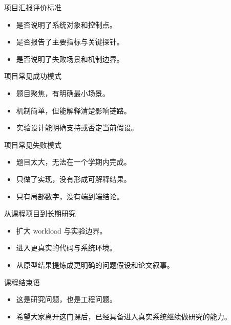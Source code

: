 \begin{frame}{项目汇报评价标准}
  \begin{itemize}
    \item 是否说明了系统对象和控制点。
    \item 是否报告了主要指标与关键探针。
    \item 是否说明了失败场景和机制边界。
  \end{itemize}
\end{frame}

\begin{frame}{项目常见成功模式}
  \begin{itemize}
    \item 题目聚焦，有明确最小场景。
    \item 机制简单，但能解释清楚影响链路。
    \item 实验设计能明确支持或否定当前假设。
  \end{itemize}
\end{frame}

\begin{frame}{项目常见失败模式}
  \begin{itemize}
    \item 题目太大，无法在一个学期内完成。
    \item 只做了实现，没有形成可解释结果。
    \item 只有局部数字，没有端到端结论。
  \end{itemize}
\end{frame}

\begin{frame}{从课程项目到长期研究}
  \begin{itemize}
    \item 扩大 workload 与实验边界。
    \item 进入更真实的代码与系统环境。
    \item 从原型结果提炼成更明确的问题假设和论文叙事。
  \end{itemize}
\end{frame}



\begin{frame}{课程结束语}
  \begin{itemize}
    \item 这是研究问题，也是工程问题。
    \item 希望大家离开这门课后，已经具备进入真实系统继续做研究的能力。
  \end{itemize}
\end{frame}

